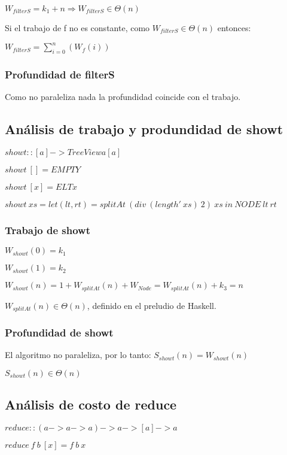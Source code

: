 \documentclass[a4paper,12pt]{article}
\begin{document}
    $W_{filterS} = k_1 + n \Rightarrow W_{filterS} \in \Theta(n)$

    Si el trabajo de f no es constante, como $W_{filterS} \in \Theta(n)$ entonces:

    $W_{filterS} = \sum_{i=0}^{n} (W_{f} (i))$


\subsubsection{Profundidad de filterS}

Como no paraleliza nada la profundidad coincide con el trabajo.

\subsection{Análisis de trabajo y produndidad de showt}

$showt :: [a] -> TreeView a [a]$

$showt\: [] = EMPTY$

$showt\: [x] = ELT x$

$showt \:xs = let (lt, rt) = splitAt\: (div\: (length'\: xs)\: 2)\: xs \:in\: NODE\: lt\: rt $

\subsubsection{Trabajo de showt}

$W_{showt} (0) = k_1$

$W_{showt} (1) = k_2$

$W_{showt} (n) = 1 + W_{splitAt}(n) + W_{Node} = W_{splitAt}(n) + k_3 = n$

$W_{splitAt}(n) \in \Theta(n)$, definido en el preludio de Haskell.

\subsubsection{Profundidad de showt}

El algoritmo no paraleliza, por lo tanto: $S_{showt}(n) = W_{showt}(n)$

$S_{showt}(n) \in \Theta(n)$
\subsection{Análisis de costo de reduce}

$reduce :: (a -> a -> a) -> a -> [a] -> a$

$reduce\: f\: b\: [x] = f \:b \:x$
\end{document}
